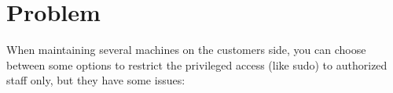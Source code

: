 %
%
%
%
%
%
%


\section{Problem}

When maintaining several machines on the customers side, you can choose between
some options to restrict the privileged access (like sudo) to authorized staff
only, but they have some issues:

